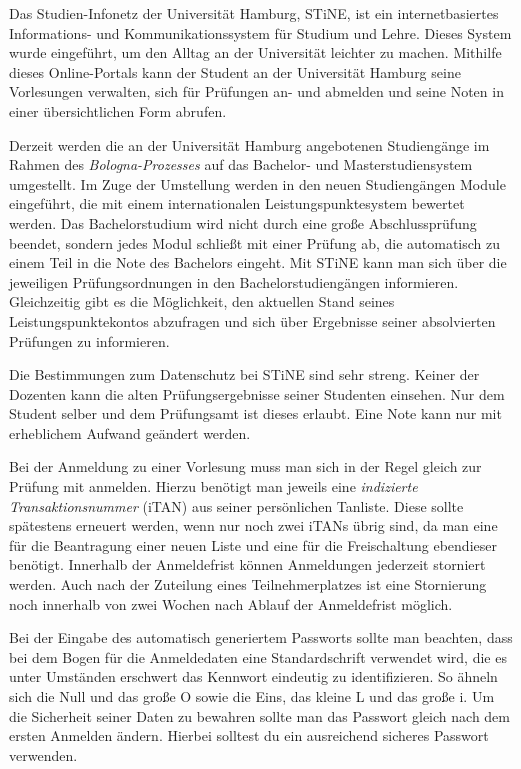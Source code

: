 Das Studien-Infonetz der Universität Hamburg, STiNE, ist ein internetbasiertes
Informations- und Kommunikationssystem für Studium und Lehre. Dieses System
wurde eingeführt, um den Alltag an der Universität leichter zu machen. Mithilfe
dieses Online-Portals kann der Student an der Universität Hamburg seine
Vorlesungen verwalten, sich für Prüfungen an- und abmelden und seine Noten in
einer übersichtlichen Form abrufen.

Derzeit werden die an der Universität Hamburg angebotenen Studiengänge im
Rahmen des \emph{Bologna-Prozesses} auf das Bachelor- und Masterstudiensystem
umgestellt. Im Zuge der Umstellung werden in den neuen Studiengängen Module
eingeführt, die mit einem internationalen Leistungspunktesystem bewertet
werden. Das Bachelorstudium wird nicht durch eine große Abschlussprüfung
beendet, sondern jedes Modul schließt mit einer Prüfung ab, die automatisch zu
einem Teil in die Note des Bachelors eingeht. Mit STiNE kann man sich über die
jeweiligen Prüfungsordnungen in den Bachelorstudiengängen informieren.
Gleichzeitig gibt es die Möglichkeit, den aktuellen Stand seines
Leistungspunktekontos abzufragen und sich über Ergebnisse seiner absolvierten
Prüfungen zu informieren.

Die Bestimmungen zum Datenschutz bei STiNE sind sehr streng. Keiner der
Dozenten kann die alten Prüfungsergebnisse seiner Studenten einsehen. Nur dem
Student selber und dem Prüfungsamt ist dieses erlaubt. Eine Note kann nur mit
erheblichem Aufwand geändert werden.

Bei der Anmeldung zu einer Vorlesung muss man sich in der Regel gleich zur
Prüfung mit anmelden. Hierzu benötigt man jeweils eine \emph{indizierte
Transaktionsnummer} (iTAN) aus seiner persönlichen Tanliste. Diese sollte
spätestens erneuert werden, wenn nur noch zwei iTANs übrig sind, da man eine
für die Beantragung einer neuen Liste und eine für die Freischaltung ebendieser
benötigt.  Innerhalb der Anmeldefrist können Anmeldungen jederzeit storniert
werden. Auch nach der Zuteilung eines Teilnehmerplatzes ist eine Stornierung
noch innerhalb von zwei Wochen nach Ablauf der Anmeldefrist möglich.

Bei der Eingabe des automatisch generiertem Passworts sollte man beachten, dass
bei dem Bogen für die Anmeldedaten eine Standardschrift verwendet wird, die es
unter Umständen erschwert das Kennwort eindeutig zu identifizieren. So ähneln
sich die Null und das große O sowie die Eins, das kleine L und das große i. Um
die Sicherheit seiner Daten zu bewahren sollte man das Passwort gleich nach dem
ersten Anmelden ändern. Hierbei solltest du ein ausreichend sicheres Passwort
verwenden.

